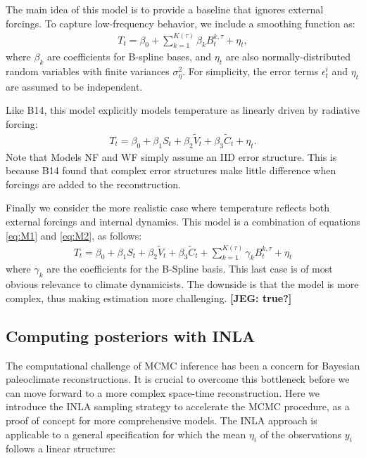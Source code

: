 \documentclass[12pt]{amsart}
\theoremstyle{plain}
\theoremstyle{definition}
\theoremstyle{remark}
\newcommand{\lb}[1]{\color{MidnightBlue}\textbf{[LB: #1]}\normalcolor}
\newcommand{\jeg}[1]{\color{ProcessBlue}\textbf{[JEG: #1]}\normalcolor}
\begin{document}
The main idea of this model is to provide a baseline that ignores external forcings. To capture low-frequency behavior, we include a smoothing function as: 
  \begin{align}\label{eq:M1}
    T_t=\beta_0+\sum_{k=1}^{K(\tau)}\beta_k B_t^{k,\tau}+\eta_t,
  \end{align}
where $\beta_k$ are coefficients for B-spline bases, and
$\eta_t$ are also normally-distributed random variables with finite variances
$\sigma^2_{\eta}$. For simplicity, the error terms $\epsilon^i_t$ and $\eta_t$
are assumed to be independent.  

Like B14, this model explicitly models temperature as linearly driven by radiative forcing:
  \begin{align}\label{eq:M2}
    T_t=\beta_0+\beta_1S_t+\beta_2\tilde V_t+\beta_3\tilde C_t+\eta_t.
  \end{align}
Note that Models NF and WF simply assume an IID error structure. This is because B14 
found that complex error structures make little difference when forcings are added to the reconstruction.

Finally we consider the more realistic case where temperature reflects both external forcings and internal dynamics. This model is a combination of equations \eqref{eq:M1} and \eqref{eq:M2}, as follows:
  \begin{align}\label{eq:M3}
    T_t=\beta_0+\beta_1S_t+\beta_2\tilde V_t+\beta_3\tilde C_t+\sum_{k=1}^{K(\tau)}\gamma_k B_t^{k,\tau}+\eta_t
  \end{align}
  where $\gamma_k$ are the coefficients for the B-Spline basis. %
  This last case is of most obvious relevance to climate dynamicists. The downside is that the model is more complex, thus making estimation more challenging. \jeg{true?}



\subsection{Computing posteriors with INLA}

The computational challenge of MCMC inference has been a concern for Bayesian paleoclimate reconstructions. It is crucial to overcome this  bottleneck before we can move forward to a more complex space-time reconstruction. Here we introduce the INLA sampling strategy to accelerate the MCMC procedure, as a proof of concept for more comprehensive models. The INLA approach is applicable to a general specification for which the mean $\eta_i$ of the observations $y_i$ follows a linear structure:
\end{document}
